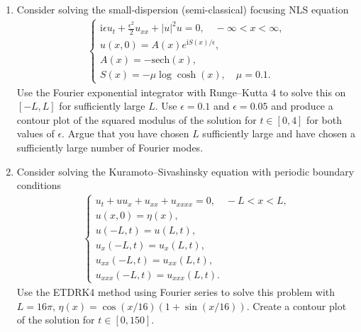 \documentclass[10pt]{amsart}
\newcommand{\I}{\text{i}}
\begin{document}
\begin{enumerate}[label={\bf Problem~{\arabic*}:}]
        \mline 

    \item Consider solving the small-dispersion (semi-classical) focusing NLS equation
  \begin{align*}
    \begin{cases}
      \I \epsilon u_t + \frac{\epsilon^2}{2} u_{xx} + |u|^2 u = 0, \quad -\infty < x < \infty,\\
      u(x,0) = A(x) e^{\I S(x)/\epsilon},\\
      A(x) = - \mathrm{sech}(x),\\
      S(x) = - \mu \log \cosh (x), \quad \mu = 0.1.
    \end{cases}
    \end{align*}
    Use the Fourier exponential integrator with Runge--Kutta 4 to solve this on $[-L, L]$ for sufficiently large $L$.  Use $\epsilon = 0.1$ and $\epsilon = 0.05$ and produce a contour plot of the squared modulus of the solution for $t \in [0,4]$ for both values of $\epsilon$.  Argue that you have chosen $L$ sufficiently large and have chosen a sufficiently large number of Fourier modes.

    \mline

    \item Consider solving the Kuramoto--Sivashinsky equation with periodic boundary conditions
 \begin{align*}
    \begin{cases} u_t + u u_x + u_{xx} + u_{xxxx} = 0, \quad -L < x <L,\\
      u(x,0) = \eta(x),\\
      u(-L,t) = u(L,t),\\
      u_x(-L,t) = u_x(L,t),\\
      u_{xx}(-L,t) = u_{xx}(L,t),\\
      u_{xxx}(-L,t) = u_{xxx}(L,t).
    \end{cases}
 \end{align*}
 Use the ETDRK4 method using Fourier series to solve this problem with $L = 16 \pi$, $\eta(x) = \cos(x/16) (1 + \sin(x/16))$.  Create a contour plot of the solution for $t \in [0,150]$.
        
  
\end{enumerate}



  
\end{document}
